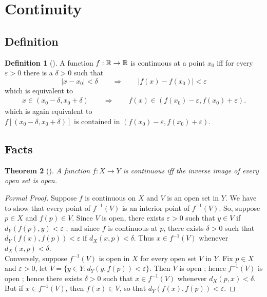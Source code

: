 \documentclass[	DIV=calc,paper=a4,fontsize=11pt]{scrartcl}	 	%
\newtheorem{thm}{Theorem}[section]
\theoremstyle{definition}
\newtheorem{defn}[thm]{Definition}
\theoremstyle{plain}
\theoremstyle{remark}
\begin{document}
\newpage
\section{Continuity}

\subsection{Definition}
\begin{defn}[\textbf{\color{blue}{Continuous}}]
A function $f:\Bbb R\rightarrow \Bbb R$ is continuous at a point $x_0$ iff for every $\varepsilon>0$ there is a $\delta>0$ such that
\[|x-x_0|<\delta\qquad \Rightarrow \qquad |f(x)-f(x_0)|<\varepsilon\]
which is equivalent to
\begin{align}
x\in (x_0-\delta,x_0+\delta)\qquad \Rightarrow \qquad f(x)\in (f(x_0)-\varepsilon,f(x_0)+\varepsilon).
\end{align}
which is again equivalent to $f[(x_0-\delta,x_0+\delta)] \text{ is contained in }(f(x_0)-\varepsilon,f(x_0)+\varepsilon).$
\end{defn}

\subsection{Facts}
\begin{thm}[]
A function $f:X\to Y$ is continuous iff the inverse image of every open set is open.
\end{thm}
\begin{proof}[Formal Proof]
Suppose $f$ is continuous on $X$ and $V$ is an open set in $Y$. We have to show that every point of $f^{-1}(V)$ is an interior point of $f^{-1}(V)$. So, suppose  $p\in X$ and $f(p)\in V$. Since $V$ is open, there exists $\varepsilon>0$ such that $y\in V$ if $d_Y(f(p), y) < \varepsilon$ ; and since $f$ is continuous at $p$, there exists $\delta > 0$
such that $d_Y(f(x), f(p)) < \varepsilon$ if $d_X(x, p) < \delta$. Thus $x\in f^{-1}(V)$ whenever $d_X(x, p) <\delta$. \\
Conversely, suppose $f^{-1}(V)$ is open in $X$ for every open set $V$ in $Y$. Fix $p\in X$ and $\varepsilon > 0$, let $V=\{y\in Y:d_Y(y, f(p)) < \varepsilon\}$.
Then $V$ is open ; hence $f^{-1}(V)$ is open ; hence there exists $\delta> 0$ such that $x\in f^{-1}(V)$ whenever $d_X(p, x) < \delta$. But if $x \in f^{-1}(V)$, then $f(x)\in V$, so that $d_Y(f(x),f(p)) < \varepsilon$.
\end{proof}
\end{document}
